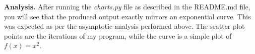 \documentclass{article}
\begin{document}
\hfill

\textbf{Analysis.} After running the \emph{charts.py} file as described in the README.md file, you will see that the produced output exactly mirrors an exponential curve. This was expected as per the asymptotic analysis performed above. The scatter-plot points are the iterations of my program, while the curve is a simple plot of $f(x) = x^2$.

\newpage
 

\end{document}
